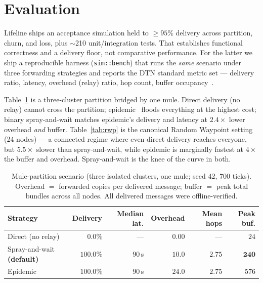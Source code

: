 \documentclass[11pt]{article}
\begin{document}
\section{Evaluation}\label{sec:eval}

Lifeline ships an acceptance simulation held to $\geq 95\%$ delivery across
partition, churn, and loss, plus $\sim$210 unit/integration tests. That
establishes functional correctness and a delivery floor, not comparative
performance. For the latter we ship a reproducible harness (\texttt{sim::bench})
that runs the \emph{same} scenario under three forwarding strategies and reports
the DTN standard metric set --- delivery ratio, latency, overhead (relay) ratio,
hop count, buffer occupancy~\cite{spyropoulos2005sprayandwait,vahdat2000epidemic}.

Table~\ref{tab:results} is a three-cluster partition bridged by one mule.
Direct delivery (no relay) cannot cross the partition; epidemic~\cite{vahdat2000epidemic}
floods everything at the highest cost; binary spray-and-wait matches epidemic's
delivery and latency at $2.4\times$ lower overhead \emph{and} buffer.
Table~\ref{tab:rwp} is the canonical Random Waypoint
setting~\cite{broch1998comparison} (24 nodes) --- a connected regime where even
direct delivery reaches everyone, but $5.5\times$ slower than spray-and-wait,
while epidemic is marginally fastest at $4\times$ the buffer and overhead.
Spray-and-wait is the knee of the curve in both.

\begin{table}[t]\centering\small
\begin{tabular}{@{}lrrrrr@{}}
\toprule
\textbf{Strategy} & \textbf{Delivery} & \textbf{Median lat.} & \textbf{Overhead} & \textbf{Mean hops} & \textbf{Peak buf.}\\
\midrule
Direct (no relay) & $0.0\%$ & --- & $0.00$ & --- & $24$\\
Spray-and-wait \textbf{(default)} & $100.0\%$ & $90$\,s & $\mathbf{10.0}$ & $2.75$ & $\mathbf{240}$\\
Epidemic & $100.0\%$ & $90$\,s & $24.0$ & $2.75$ & $576$\\
\bottomrule
\end{tabular}
\caption{Mule-partition scenario (three isolated clusters, one mule; seed 42, 700
ticks). Overhead $=$ forwarded copies per delivered message; buffer $=$ peak total
bundles across all nodes. All delivered messages were offline-verified.}
\label{tab:results}
\end{table}
\end{document}
